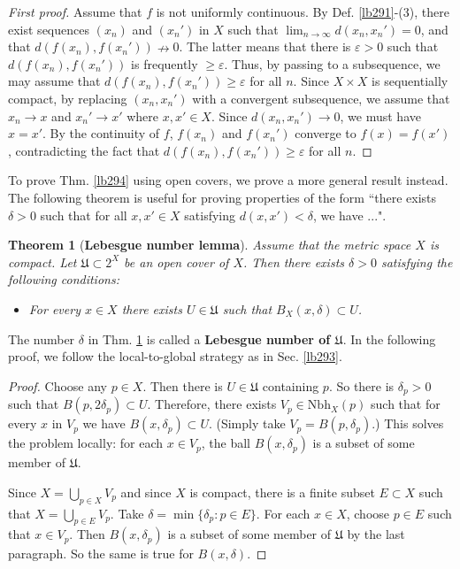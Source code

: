 \documentclass[12pt,b5paper,notitlepage]{article}
\theoremstyle{definition}
\theoremstyle{plain}
\newtheorem{thm}[df]{Theorem}
\newcommand{\fk}{\mathfrak}
\newcommand{\Nbh}{\mathrm{Nbh}}
\newcommand{\eps}{\varepsilon}
\numberwithin{equation}{section}
\begin{document}
\begin{proof}[First proof]
Assume that $f$ is not uniformly continuous. By Def. \ref{lb291}-(3), there exist sequences $(x_n)$ and $(x_n')$ in $X$ such that $\lim_{n\rightarrow\infty}d(x_n,x_n')=0$, and that $d(f(x_n),f(x_n'))\nrightarrow0$. The latter means that there is $\eps>0$ such that $d(f(x_n),f(x_n'))$ is frequently $\geq\eps$. Thus, by passing to a subsequence, we may assume that $d(f(x_n),f(x_n'))\geq\eps$ for all $n$. Since $X\times X$ is sequentially compact, by replacing $(x_n,x_n')$ with a convergent subsequence, we assume that $x_n\rightarrow x$ and $x_n'\rightarrow x'$ where $x,x'\in X$. Since $d(x_n,x_n')\rightarrow0$, we must have $x=x'$. By the continuity of $f$, $f(x_n)$ and $f(x_n')$ converge to $f(x)=f(x')$, contradicting the fact that $d(f(x_n),f(x_n'))\geq\eps$ for all $n$. 
\end{proof}


To prove Thm. \ref{lb294} using open covers, we prove a more general result instead. The following theorem is useful for proving properties of the form ``there exists $\delta>0$ such that for all $x,x'\in X$ satisfying $d(x,x')<\delta$, we have ...".


\begin{thm}[\textbf{Lebesgue number lemma}]  \label{lb295}
Assume that the metric space $X$ is compact. Let $\fk U\subset 2^X$ be an open cover of $X$. Then there exists $\delta>0$ satisfying the following conditions:
\begin{itemize}
\item For every $x\in X$ there exists $U\in\fk U$ such that $B_X(x,\delta)\subset U$.
\end{itemize}
\end{thm}

The number $\delta$ in Thm. \ref{lb295} is called a \textbf{Lebesgue number of $\fk U$}.  In the following proof, we follow the local-to-global strategy as in Sec. \ref{lb293}. 

\begin{proof}
Choose any $p\in X$. Then there is $U\in\fk U$ containing $p$. So there is $\delta_p>0$ such that $B(p,2\delta_p)\subset U$. Therefore, there exists $V_p\in\Nbh_X(p)$ such that for every $x$ in $V_p$ we have $B(x,\delta_p)\subset U$. (Simply take $V_p=B(p,\delta_p)$.) This solves the problem locally: for each $x\in V_p$, the ball $B(x,\delta_p)$ is a subset of some member of $\fk U$.

Since $X=\bigcup_{p\in X}V_p$ and since $X$ is compact, there is a finite subset $E\subset X$ such that $X=\bigcup_{p\in E}V_p$. Take $\delta=\min\{\delta_p:p\in E\}$. For each $x\in X$, choose $p\in E$ such that $x\in V_p$. Then $B(x,\delta_p)$ is a subset of some member of $\fk U$ by the last paragraph. So the same is true for $B(x,\delta)$.
\end{proof}
\end{document}
